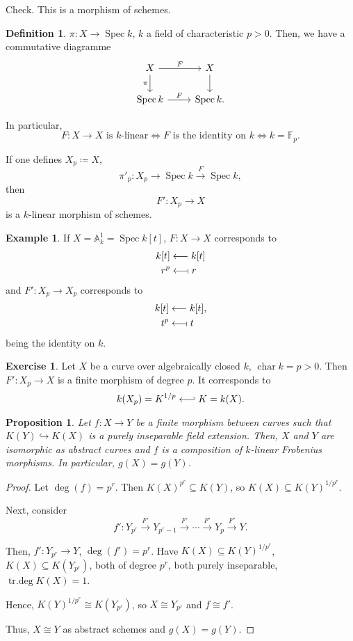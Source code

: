 \documentclass[12pt]{article}
\DeclareMathOperator{\Spec}{Spec}
\DeclareMathOperator{\chara}{char}
\DeclareMathOperator{\trdeg}{tr.deg}
\newtheorem*{proposition}{Proposition}
\theoremstyle{definition}
\newtheorem*{definition}{Definition}
\newtheorem*{exercise}{Exercise}
\newtheorem*{example}{Example}
\begin{document}
Check. This is a morphism of schemes.

\begin{definition}
$\pi:X\rightarrow\Spec k$, $k$ a field of characteristic $p>0$. Then, we have a commutative diagramme
\[
\begin{tikzcd}
X\arrow[r,"F"]\arrow[d,swap,"\pi"]&X\arrow[d]\\
\Spec k\arrow[r,"F"]&\Spec k.
\end{tikzcd}
\]

In particular,
\[F:X\rightarrow X\text{ is }k\text{-linear}\Longleftrightarrow F\text{ is the identity on }k\Longleftrightarrow k=\mathbb{F}_p.\]

If one defines $X_p\coloneqq X$,
\[\pi'_p:X_p\longrightarrow\Spec k\overset{F}{\longrightarrow}\Spec k,\]
then
\[F':X_p\longrightarrow X\]
is a $k$-linear morphism of schemes.
\end{definition}

\begin{example}
If $X=\mathbb{A}_k^1=\Spec k[t]$, $F:X\rightarrow X$ corresponds to
\begin{align*}
k[t]&\longleftarrow k[t]\\
r^p&\longleftarrow\!\shortmid r
\end{align*}
and $F':X_p\rightarrow X_p$ corresponds to
\begin{align*}
k[t]&\longleftarrow k[t],\\
t^p&\longleftarrow\!\shortmid t
\end{align*}
being the identity on $k$.
\end{example}

\begin{exercise}
Let $X$ be a curve over algebraically closed $k$, $\chara k=p>0$. Then $F':X_p\rightarrow X$ is a finite morphism of degree $p$. It corresponds to
\[k(X_p)=K^{1/p}\longleftarrow\joinrel\rhook K=k(X).\]
\end{exercise}

\begin{proposition}
Let $f:X\rightarrow Y$ be a finite morphism between curves such that $K(Y)\hookrightarrow K(X)$ is a purely inseparable field extension. Then, $X$ and $Y$ are isomorphic as abstract curves and $f$ is a composition of $k$-linear Frobenius morphisms. In particular, $g(X)=g(Y)$.
\end{proposition}

\begin{proof}
Let $\deg(f)=p^r$. Then $K(X)^{p^r}\subseteq K(Y)$, so $K(X)\subseteq K(Y)^{1/p^r}$.

Next, consider
\[f':Y_{p^r}\overset{F'}{\longrightarrow}Y_{p^r-1}\overset{F'}{\longrightarrow}\cdots\overset{F'}{\longrightarrow}Y_p\overset{F'}{\longrightarrow}Y.\]

Then, $f':Y_{p^r}\rightarrow Y$, $\deg(f')=p^r$. Have $K(X)\subseteq K(Y)^{1/p^r}$, $K(X)\subseteq K(Y_{p^r})$, both of degree $p^r$, both purely inseparable, $\trdeg K(X)=1$.

Hence, $K(Y)^{1/p^r}\cong K(Y_{p^r})$, so $X\cong Y_{p^r}$ and $f\cong f'$.

Thus, $X\cong Y$ as abstract schemes and $g(X)=g(Y)$.
\end{proof}
\end{document}
